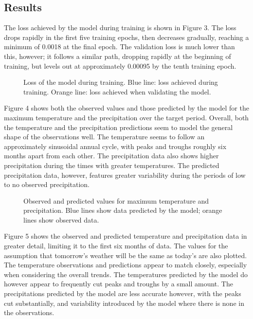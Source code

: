 \documentclass[12pt]{article}
\begin{document}
    \subsection{Results}

    The loss achieved by the model during training is shown in Figure 3. The loss drops rapidly in the first five training epochs, then decreases gradually, reaching a minimum of 0.0018 at the final epoch. The validation loss is much lower than this, however; it follows a similar path, dropping rapidly at the beginning of training, but levels out at approximately 0.00095 by the tenth training epoch.
    
    \begin{figure}
        \centering
        
        \caption{Loss of the model during training. Blue line: loss achieved during training. Orange line: loss achieved when validating the model.}
        \label{fig:weather_loss}
    \end{figure}

    Figure 4 shows both the observed values and those predicted by the model for the maximum temperature and the precipitation over the target period. Overall, both the temperature and the precipitation predictions seem to model the general shape of the observations well. The temperature seems to follow an approximately sinusoidal annual cycle, with peaks and troughs roughly six months apart from each other. The precipitation data also shows higher precipitation during the times with greater temperatures. The predicted precipitation data, however, features greater variability during the periods of low to no observed precipitation.
    
    \begin{figure}
        \centering
        
        \caption{Observed and predicted values for maximum temperature and precipitation. Blue lines show data predicted by the model; orange lines show observed data.}
        \label{fig:weather_prediction}
    \end{figure}

    Figure 5 shows the observed and predicted temperature and precipitation data in greater detail, limiting it to the first six months of data. The values for the assumption that tomorrow's weather will be the same as today's are also plotted. The temperature observations and predictions appear to match closely, especially when considering the overall trends. The temperatures predicted by the model do however appear to frequently cut peaks and troughs by a small amount. The precipitations predicted by the model are less accurate however, with the peaks cut substantially, and variability introduced by the model where there is none in the observations.
\end{document}
